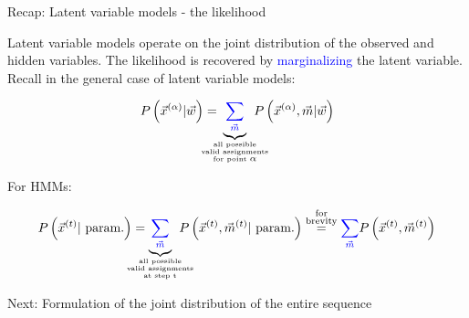\begin{frame}{Recap: Latent variable models - the likelihood}

Latent variable models operate on the joint distribution of the observed and hidden variables.
The likelihood is recovered by \textcolor{blue}{marginalizing} the latent variable.
Recall in the general case of latent variable models:

\begin{equation}
P \left( \vec{x}^{(\alpha)} | \vec{w} \right) =
\kern-3.5ex
\underbrace{{\color{blue}\sum_{\vec{m}}}}_{
\substack{
\text{\tiny all possible}\\
\text{\tiny valid assignments}\\
\text{\tiny for point }\alpha}} 
\kern-3ex
P \left( \vec{x}^{(\alpha)}, \vec{m} | \vec{w} \right)
\end{equation}

\pause

\svspace{-5mm}

For HMMs:

\svspace{-5mm}

\begin{equation}
P \left( \vec{x}^{(t)} |~\text{param.} \right) =
\kern-4ex
\underbrace{{\color{blue}\sum_{\vec{m}}}}_{
\substack{
\text{\tiny all possible}\\
\text{\tiny valid assignments}\\
\text{\tiny at step t}
}
}
\kern-3ex
P \left( \vec{x}^{(t)}, \vec{m}^{(t)} |~\text{param.} \right)
\stackrel{\substack{\text{for}\\
\text{brevity}}}{=}
{\color{blue}\sum_{\vec{m}}}
P \left( \vec{x}^{(t)}, \vec{m}^{(t)} \right)
\end{equation}

\pause

Next: Formulation of the joint distribution of the entire sequence

\pause



\end{frame}


